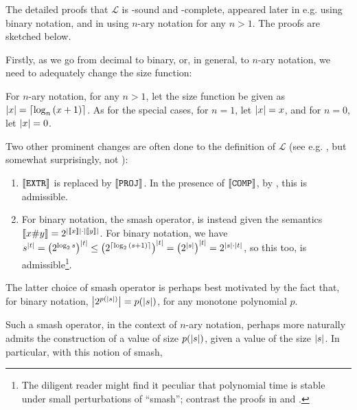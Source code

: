 The detailed proofs that $\mathcal{L}$ is \FPTIME-sound and \FPTIME-complete,
appeared later in e.g.  \cite{rose-1984,clote-1999} using binary notation, and
in \cite{tourlakis-1984} using $n$-ary notation for any $n>1$.  The proofs are
sketched below. 

Firstly, as we go from decimal to binary, or, in general, to $n$-ary notation,
we need to adequately change the size function:

\begin{definition} For $n$-ary notation, for any $n>1$, let the size function be
given as $\card{x} = \ceil{\log_n\p{x+1}}$. As for the special cases, for
$n=1$, let $\card{x}=x$, and for $n=0$, let $\card{x}=0$.  \end{definition}

Two other prominent changes are often done to the definition of $\mathcal{L}$
(see e.g. \cite{rose-1984, buss-phd-1985-6, bellantoni-cook-1992, clote-1999},
but somewhat surprisingly, not \cite{tourlakis-1984}):

\begin{enumerate}[label=(\arabic*)]

\item $\sem{\mathtt{EXTR}}$ is replaced by $\sem{\mathtt{PROJ}}$. In the
presence of $\sem{\mathtt{COMP}}$, by , this is
admissible.

\item For binary notation, the smash operator, is instead given the semantics
$\sem{x \smashf{} y} = 2^{\card{\sem{x}} \cdot \card{\sem{y}}}$. For binary
notation, we have $s^\card{t} = \p{2^{\log_2{s}}}^\card{t} \leq
\p{2^{\ceil{\log_2\p{s+1}}}}^\card{t} = \p{2^\card{s}}^\card{t} = 2^{\card{s}
\cdot \card{t}}$, so this too, is admissible\footnote{The diligent reader might
find it peculiar that polynomial time is stable under small perturbations of
``smash''; contrast the proofs in \cite{tourlakis-1984} and
\cite{clote-1999}.}.

\end{enumerate}

The latter choice of smash operator is perhaps best motivated by the fact that,
for binary notation, $\card{2^{p\p{\card{s}}}} = p\p{\card{s}}$, for any
monotone polynomial $p$.

Such a smash operator, in the context of $n$-ary notation,  perhaps more
naturally admits the construction of a value of size $p\p{\card{s}}$, given a
value of the size $\card{s}$. In particular, with this notion of smash,

